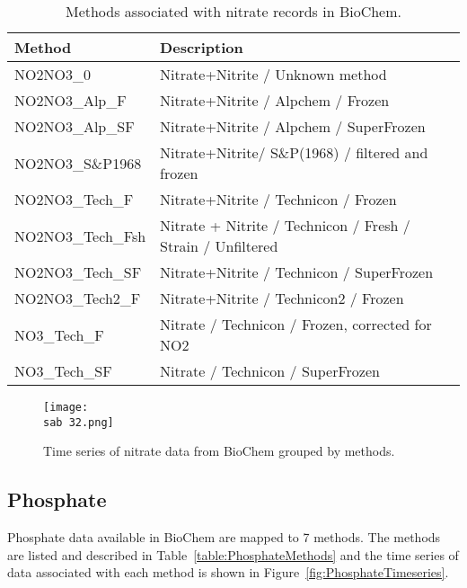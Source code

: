 \documentclass[letterpaper,portrait,11pt]{scrartcl}
\numberwithin{equation}{section}		%
\numberwithin{figure}{section}		%
\numberwithin{table}{section}				%
\newcommand{\ecomod}{\string~/ecomod_data/}   %
\newcommand{\sab}{\ecomod/mpa/sab/}   %
\begin{document}
\begin{appendices}
\begin{table}[h]
  \caption{Methods associated with nitrate records in BioChem.}
    \label{table:Nmethods}
  \begin{tabular}{ll}
    Method & Description\\
    \hline
    NO2NO3\_0 & Nitrate+Nitrite / Unknown method \\
    NO2NO3\_Alp\_F & Nitrate+Nitrite / Alpchem / Frozen \\
    NO2NO3\_Alp\_SF & Nitrate+Nitrite / Alpchem / SuperFrozen \\
    NO2NO3\_S\&P1968 & Nitrate+Nitrite/ S\&P(1968) / filtered and frozen \\
    NO2NO3\_Tech\_F & Nitrate+Nitrite / Technicon / Frozen \\
    NO2NO3\_Tech\_Fsh & Nitrate + Nitrite / Technicon / Fresh / Strain / Unfiltered \\
    NO2NO3\_Tech\_SF & Nitrate+Nitrite / Technicon / SuperFrozen \\
    NO2NO3\_Tech2\_F & Nitrate+Nitrite / Technicon2 / Frozen \\
    NO3\_Tech\_F & Nitrate / Technicon / Frozen, corrected for NO2 \\
    NO3\_Tech\_SF & Nitrate / Technicon / SuperFrozen\\
  \end{tabular}
\end{table}

\begin{figure}[h]

  \centering
  \texttt{[image: \\sab 32.png]}
  \caption{Time series of nitrate data from BioChem grouped by methods.}
    \label{fig:NTimeseries}
\end{figure}

\subsection{Phosphate}

Phosphate  data available in BioChem are mapped to 7 methods. The methods are listed and described in Table~\ref{table:PhosphateMethods} and the time series of data associated with each method is shown in Figure~\ref{fig:PhosphateTimeseries}.


\end{appendices}
\end{document}
